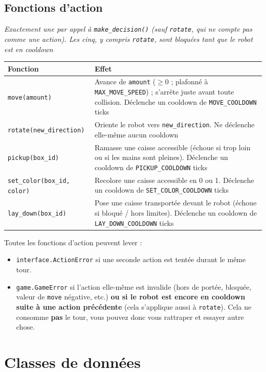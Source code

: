 \documentclass[11pt,a4paper]{article}
\newcommand{\code}[1]{\texttt{#1}}
\newcommand{\func}[1]{\texttt{#1}}
\begin{document}
\subsection{Fonctions d'action}
\emph{Exactement une par appel à \func{make\_decision()} (sauf
\func{rotate}, qui ne compte pas comme une action). Les cinq, y compris
\func{rotate}, sont bloquées tant que le robot est en cooldown}

\begin{longtable}{p{6.7cm}p{8.3cm}}
\toprule
\textbf{Fonction} & \textbf{Effet} \\
\midrule
\endhead
\func{move(amount)} & Avance de \code{amount} ($\geq 0$ ; plafonné à \code{MAX\_MOVE\_SPEED}) ; s'arrête juste avant toute collision. Déclenche un cooldown de \code{MOVE\_COOLDOWN} ticks \\
\func{rotate(new\_direction)} & Oriente le robot vers \code{new\_direction}. Ne déclenche elle-même aucun cooldown \\
\func{pickup(box\_id)} & Ramasse une caisse accessible (échoue si trop loin ou si les mains sont pleines). Déclenche un cooldown de \code{PICKUP\_COOLDOWN} ticks \\
\func{set\_color(box\_id, color)} & Recolore une caisse accessible en 0 ou 1. Déclenche un cooldown de \code{SET\_COLOR\_COOLDOWN} ticks \\
\func{lay\_down(box\_id)} & Pose une caisse transportée devant le robot (échoue si bloqué / hors limites). Déclenche un cooldown de \code{LAY\_DOWN\_COOLDOWN} ticks \\
\bottomrule
\end{longtable}

Toutes les fonctions d'action peuvent lever :
\begin{itemize}[nosep]
    \item \code{interface.ActionError} si une seconde action est tentée
          durant le même tour.
    \item \code{game.GameError} si l'action elle-même est invalide (hors de
          portée, bloquée, valeur de \func{move} négative, etc.) \textbf{ou si
          le robot est encore en cooldown suite à une action précédente}
          (cela s'applique aussi à \func{rotate}). Cela ne consomme
          \textbf{pas} le tour, vous pouvez donc vous rattraper et essayer
          autre chose.
\end{itemize}

\section{Classes de données}
\end{document}
